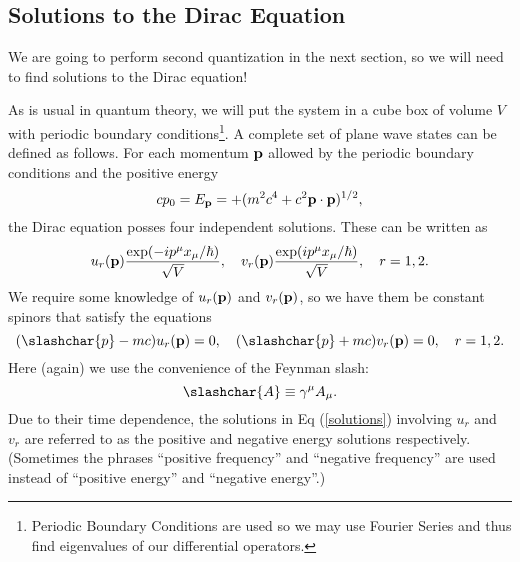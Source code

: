 \subsection{Solutions to the Dirac Equation}

We are going to perform second quantization in the next section, so we will need to find solutions to the Dirac equation!

As is usual in quantum theory, we will put the system in a cube box of volume
$V$ with periodic boundary conditions\footnote{Periodic Boundary Conditions are
used so we may use Fourier Series and thus find eigenvalues of our differential
operators.}. A complete set of plane wave states can be defined as follows. For
each momentum $\bold{p}$ allowed by the periodic boundary conditions and the
positive energy
\begin{equation}
cp_0 = E_{\bold{p}} = + (m^2c^4 + c^2\bold{p}\cdot\bold{p})^{1/2},
\end{equation}
the Dirac equation posses four independent solutions. These can be written as
\begin{equation}\label{solutions}
u_{r}(\bold{p})\frac{\exp(-ip^\mu x_\mu/\hbar)}{\sqrt{V}},\quad v_{r}(\bold{p})\frac{\exp(ip^\mu x_\mu/\hbar)}{\sqrt{V}},\quad r=1,2.
\end{equation}
We require some knowledge of $u_{r}(\bold{p})$ and $v_{r}(\bold{p})$, so we have
them be constant spinors that satisfy the equations
\begin{equation}
(\slashchar{p}-mc)u_r(\bold{p}) = 0,\quad (\slashchar{p}+mc)v_r(\bold{p}) = 0, \quad r=1,2.
\end{equation}
Here (again) we use the convenience of the Feynman slash:
\begin{equation}
\slashchar{A} \equiv \gamma^\mu A_\mu.
\end{equation}
Due to their time dependence, the solutions in Eq (\ref{solutions}) involving $u_r$ and
$v_r$ are  referred to as the positive and negative energy solutions respectively.
(Sometimes the phrases ``positive frequency'' and ``negative frequency'' are used
instead of ``positive energy'' and ``negative energy''.)

